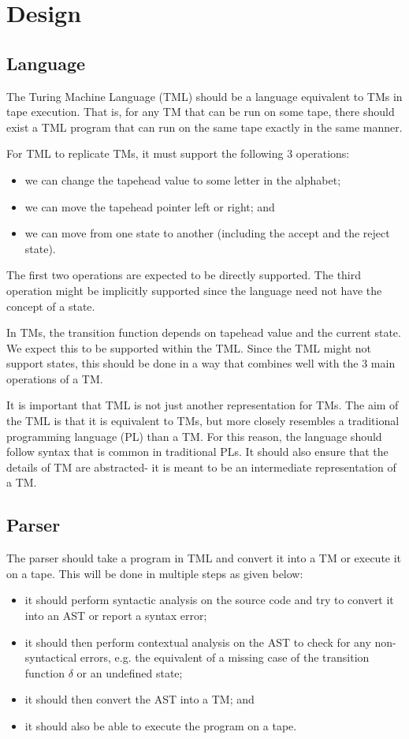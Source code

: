 \chapter{Design}
\section{Language}
The Turing Machine Language (TML) should be a language equivalent to TMs in tape execution. That is, for any TM that can be run on some tape, there should exist a TML program that can run on the same tape exactly in the same manner.

For TML to replicate TMs, it must support the following 3 operations:
\begin{itemize}
    \item we can change the tapehead value to some letter in the alphabet;
    \item we can move the tapehead pointer left or right; and
    \item we can move from one state to another (including the accept and the reject state).
\end{itemize}
The first two operations are expected to be directly supported. The third operation might be implicitly supported since the language need not have the concept of a state.

In TMs, the transition function depends on tapehead value and the current state. We expect this to be supported within the TML. Since the TML might not support states, this should be done in a way that combines well with the 3 main operations of a TM.

It is important that TML is not just another representation for TMs. The aim of the TML is that it is equivalent to TMs, but more closely resembles a traditional programming language (PL) than a TM. For this reason, the language should follow syntax that is common in traditional PLs. It should also ensure that the details of TM are abstracted- it is meant to be an intermediate representation of a TM.

\section{Parser}
The parser should take a program in TML and convert it into a TM or execute it on a tape. This will be done in multiple steps as given below:
\begin{itemize}
    \item it should perform syntactic analysis on the source code and try to convert it into an AST or report a syntax error;
    \item it should then perform contextual analysis on the AST to check for any non-syntactical errors, e.g. the equivalent of a missing case of the transition function $\delta$ or an undefined state;
    \item it should then convert the AST into a TM; and
    \item it should also be able to execute the program on a tape. 
\end{itemize}

